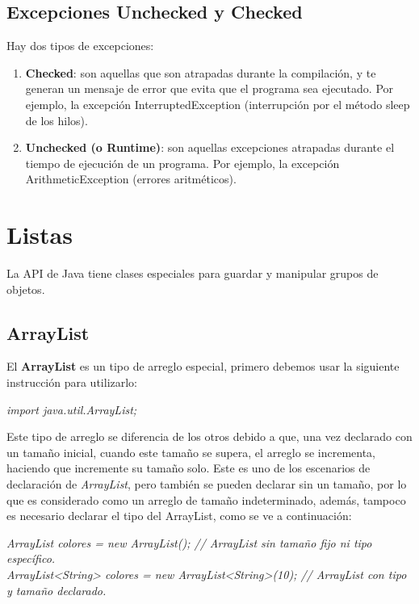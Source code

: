 \subsection{Excepciones Unchecked y Checked}
\hspace{0.55cm}Hay dos tipos de excepciones:
\begin{enumerate}
    \item \textbf{Checked}: son aquellas que son atrapadas durante la compilación, y te generan un mensaje de error que evita que el programa sea ejecutado. Por ejemplo, la excepción InterruptedException (interrupción por el método sleep de los hilos).
    \item \textbf{Unchecked (o Runtime)}: son aquellas excepciones atrapadas durante el tiempo de ejecución de un programa. Por ejemplo, la excepción ArithmeticException (errores aritméticos).
\end{enumerate}



\section{Listas}
\hspace{0.55cm}La API de Java tiene clases especiales para guardar y manipular grupos de objetos.


\subsection{ArrayList}
\hspace{0.55cm}El \textbf{ArrayList} es un tipo de arreglo especial, primero debemos usar la siguiente instrucción para utilizarlo:
\begin{center}
	\textit{import java.util.ArrayList;}
\end{center}

Este tipo de arreglo se diferencia de los otros debido a que, una vez declarado con un tamaño inicial, cuando este tamaño se supera, el arreglo se incrementa, haciendo que incremente su tamaño solo. Este es uno de los escenarios de declaración de \textit{ArrayList}, pero también se pueden declarar sin un tamaño, por lo que es considerado como un arreglo de tamaño indeterminado, además, tampoco es necesario declarar el tipo del ArrayList, como se ve a continuación:
\begin{center}
	\textit{
		ArrayList colores = new ArrayList(); // ArrayList sin tamaño fijo ni tipo específico. \\
		ArrayList<String> colores = new ArrayList<String>(10); // ArrayList con tipo y tamaño declarado.
	}
\end{center}

